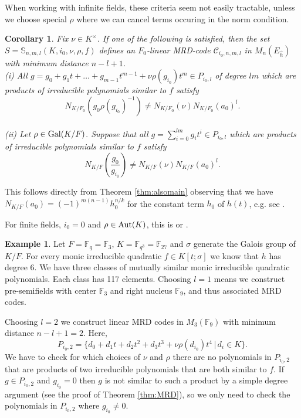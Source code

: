 \documentclass[12pt]{amsart}
\theoremstyle{plain}
\newtheorem{corollary}[theorem]{Corollary}
\theoremstyle{definition}
\newtheorem{example}[theorem]{Example}
\numberwithin{equation}{section}
\numberwithin{figure}{section}
\begin{document}
When working with infinite fields, these criteria seem not easily tractable, unless we choose special $\rho$ where we can cancel terms occuring in the norm condition.

\begin{corollary}
 Fix $\nu \in K^\times$.  If one of the following is satisfied, then the set $S=\mathbb{S}_{n,m,l}(K,i_0,\nu,\rho, f)$ defines an $F_0$-linear MRD-code $\mathcal{C}_{i_0, n,m,l}$  in $M_n(E_{\hat{h}})$ with minimum distance $n-l+1$.
\\ (i) All $g=g_0+g_1t+\dots+g_{m-1}t^{m-1}+\nu\rho(g_{i_0})t^m \in P_{i_0,l}$
of degree $lm$ which are products of irreducible polynomials similar to $f$ satisfy
$$N_{K/F_0}(g_0\rho(g_{i_0})^{-1} )\not= N_{K/F_0}( \nu) N_{K/F_0}(a_0)^l.$$
\\ (ii) Let $\rho\in {\rm Gal}(K/F)$. Suppose that all $g=\sum_{i=0}^{lm} g_it^i\in P_{i_0,l}$ which are products of irreducible polynomials similar to $f$ satisfy
 $$N_{K/F}(\frac{g_0}{ g_{i_0}})\not= N_{K/F}( \nu) N_{K/F}(a_0)^l.$$
\end{corollary}

This follows directly from Theorem \ref{thm:alsomain} observing that 
we have $N_{K/F}(a_0)=(-1)^{m(n-1)}h_0^{n/k}$ for the constant term $h_0$ of $h(t)$, e.g. see \cite[Theorem 3.12]{NewS}.

For finite fields, $i_0=0$ and $\rho \in {\rm Aut}(K)$, this is \cite[Theorem 7]{Sheekey} or \cite[Theorem 24]{PT}.


\begin{example}
Let $F=\mathbb{F}_q=\mathbb{F}_3$, $K=\mathbb{F}_{q^3}=\mathbb{F}_{27}$ and $\sigma$ generate the Galois group of $K/F$. For every monic irreducible quadratic $f\in K[t;\sigma]$ we know that $h$ has degree 6. We have three classes of mutually similar monic irreducible quadratic polynomials. Each class has 117 elements. Choosing $l=1$ means we construct pre-semifields with center $\mathbb{F}_3$ and right nucleus $\mathbb{F}_9$, and  thus  associated MRD codes.

Choosing $l=2$ we construct linear MRD codes
 in $M_{3}(\mathbb{F}_9)$ with minimum distance $n-l+1=2$. Here,
 $$P_{i_0,2}=\lbrace d_0+d_1t +d_2t^2+d_{3}t^{3}+\nu\rho(d_{i_0})t^{4}\,|\, d_i\in K \rbrace.$$
  We have to check for which choices of $\nu$ and $\rho$ there are no polynomials in $P_{i_0,2}$ that are products of two irreducible polynomials that are both similar to $f$. If $g\in P_{i_0,2}$ and $g_{i_0}=0$ then $g$ is not similar to such a product by a simple degree argument (see the proof of Theorem \ref{thm:MRD}), so we only need to check the polynomials in $P_{i_0,2}$ where $g_{i_0}\not=0$.
\end{example}
\end{document}
